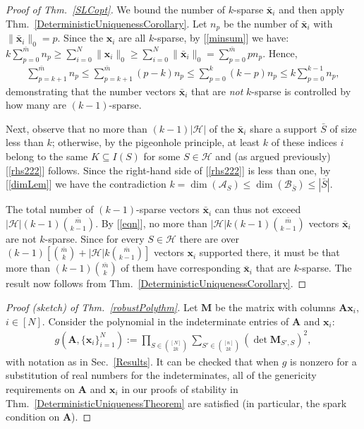 \documentclass[9pt,twocolumn]{pnas-new}
\renewcommand{\eqref}[1]{\textnormal{[\ref{#1}]}}
\begin{document}
\begin{proof}[Proof of Thm.~\ref{SLCopt}]
We bound the number of $k$-sparse $\mathbf{\bar x}_i$ and then apply Thm.~\ref{DeterministicUniquenessCorollary}. 
Let $n_p$ be the number of $\mathbf{\bar x}_i$ with $\|\mathbf{\bar x}_i\|_0 = p$.
Since the $\mathbf{x}_i$ are all $k$-sparse, by \eqref{minsum} we have:
\mbox{$k \sum_{p = 0}^{\bar m} n_p \geq \sum_{i=0}^N \|\mathbf{x}_i\|_0 \geq \sum_{i=0}^N \|\mathbf{\bar x}_i\|_0 = \sum_{p=0}^{\bar m} p n_p.$}
Hence,
\begin{align}\label{eqn}
\sum_{p = k+1}^{\bar m} n_p \leq \sum_{p = k+1}^{\bar m} (p-k) n_p \leq \sum_{p = 0}^k (k-p)n_p \leq k \sum_{p = 0}^{k-1} n_p,
\end{align}
%
demonstrating that the number vectors $\mathbf{\bar x}_i$ that are \emph{not} $k$-sparse is controlled by how many are $(k-1)$-sparse. 

Next, observe that no more than $(k-1)|\mathcal{H}|$ of the $\mathbf{\bar x}_i$ share a support $\bar S$ of size less than $k$; otherwise, by the pigeonhole principle, at least $k$ of these indices $i$ belong to the same $K \subseteq I(S)$ for some $S \in \mathcal{H}$ and (as argued previously) \eqref{rhs222} follows. Since the right-hand side of \eqref{rhs222} is less than one, by \eqref{dimLem} we have the contradiction $k = \dim(\bm{\mathcal{A}}_S) \leq \dim(\bm{\mathcal{B}}_{\bar S}) \leq |\bar S|.$ 

The total number of $(k-1)$-sparse vectors $\mathbf{\bar x}_i$ can thus not exceed $|\mathcal{H}|(k-1){ \bar m \choose k-1}$. By \eqref{eqn}, no more than $|\mathcal{H}|k(k-1){ \bar m \choose k-1}$ vectors $\mathbf{\bar x}_i$ are not $k$-sparse. Since for every $S \in \mathcal{H}$ there are over $(k-1)\left[ {\bar m \choose k} + |\mathcal{H}|k{ \bar m \choose k-1} \right]$ vectors $\mathbf{x}_i$ supported there, it must be that more than $(k-1){\bar m \choose k}$ of them have corresponding $\mathbf{\bar x}_i$ that are $k$-sparse. The result now follows from Thm.~\ref{DeterministicUniquenessCorollary}.
\end{proof}

\begin{proof}[Proof (sketch) of Thm.~\ref{robustPolythm}]
Let $\textbf{M}$ be the matrix with columns $\mathbf{A}\mathbf{x}_i$, $i \in [N]$.  Consider the polynomial in the indeterminate entries of $\mathbf{A}$ and $\mathbf{x}_i$:
\begin{align*}
g(\mathbf{A}, \{\mathbf{x}_i\}_{i=1}^N) := \prod_{S \in {[N] \choose 2k}} \sum_{S' \in {[n] \choose 2k}} (\det \textbf{M}_{S',S})^2,
\end{align*}
with notation as in Sec.~\ref{Results}.  
It can be checked that when $g$ is nonzero for a substitution of real numbers for the indeterminates, all of the genericity requirements on $\mathbf{A}$ and $\mathbf{x}_i$ in our proofs of stability in Thm.~\ref{DeterministicUniquenessTheorem} are satisfied (in particular, the spark condition on $\mathbf{A}$).
\end{proof}
\end{document}
